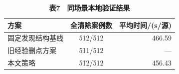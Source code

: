 \begin{table}[H]
\centering
\caption{\textbf{表7　同场景本地验证结果}}
\small
\begin{tabular}{@{}lcr@{}}

\toprule\noalign{}
方案 & 全清除案例数 & 平均时间/(s/源) \\
\midrule\noalign{}

固定发现结构基线 & 512/512 & 466.59 \\
旧经验删点方案 & 511/512 & --- \\
本文策略 & 512/512 & 456.43 \\
\bottomrule
\end{tabular}
\end{table}
